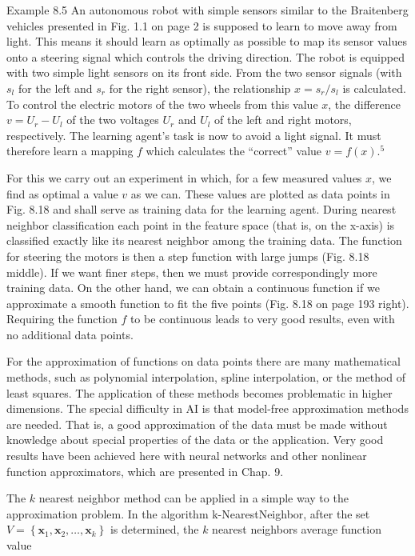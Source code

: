 \documentclass[10pt]{book}
\begin{document}
Example 8.5 An autonomous robot with simple sensors similar to the Braitenberg vehicles presented in Fig. 1.1 on page 2 is supposed to learn to move away from light. This means it should learn as optimally as possible to map its sensor values onto a steering signal which controls the driving direction. The robot is equipped with two simple light sensors on its front side. From the two sensor signals (with $s_{l}$ for the left and $s_{r}$ for the right sensor), the relationship $x=s_{r} / s_{l}$ is calculated. To control the electric motors of the two wheels from this value $x$, the difference $v=U_{r}-U_{l}$ of the two voltages $U_{r}$ and $U_{l}$ of the left and right motors, respectively. The learning agent's task is now to avoid a light signal. It must therefore learn a mapping $f$ which calculates the ``correct'' value $v=f(x) .^{5}$

For this we carry out an experiment in which, for a few measured values $x$, we find as optimal a value $v$ as we can. These values are plotted as data points in Fig. 8.18 and shall serve as training data for the learning agent. During nearest neighbor classification each point in the feature space (that is, on the x-axis) is classified exactly like its nearest neighbor among the training data. The function for steering the motors is then a step function with large jumps (Fig. 8.18 middle). If we want finer steps, then we must provide correspondingly more training data. On the other hand, we can obtain a continuous function if we approximate a smooth function to fit the five points (Fig. 8.18 on page 193 right). Requiring the function $f$ to be continuous leads to very good results, even with no additional data points.

For the approximation of functions on data points there are many mathematical methods, such as polynomial interpolation, spline interpolation, or the method of least squares. The application of these methods becomes problematic in higher dimensions. The special difficulty in AI is that model-free approximation methods are needed. That is, a good approximation of the data must be made without knowledge about special properties of the data or the application. Very good results have been achieved here with neural networks and other nonlinear function approximators, which are presented in Chap. 9.

The $k$ nearest neighbor method can be applied in a simple way to the approximation problem. In the algorithm k-NearestNeighbor, after the set $V=\left\{\boldsymbol{x}_{1}, \boldsymbol{x}_{2}, \ldots, \boldsymbol{x}_{k}\right\}$ is determined, the $k$ nearest neighbors average function value
\end{document}
